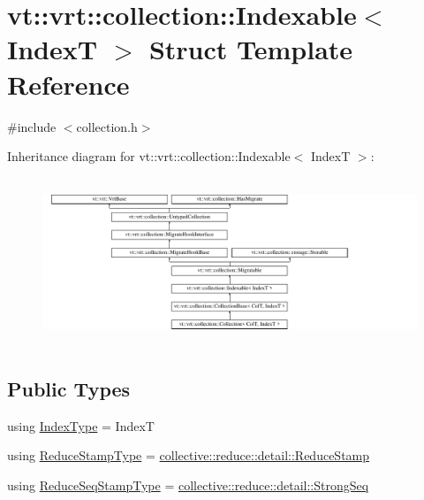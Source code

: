 \hypertarget{structvt_1_1vrt_1_1collection_1_1_indexable}{}\section{vt\+:\+:vrt\+:\+:collection\+:\+:Indexable$<$ IndexT $>$ Struct Template Reference}
\label{structvt_1_1vrt_1_1collection_1_1_indexable}


{\ttfamily \#include $<$collection.\+h$>$}

Inheritance diagram for vt\+:\+:vrt\+:\+:collection\+:\+:Indexable$<$ IndexT $>$\+:\begin{figure}[H]
\begin{center}
\leavevmode
\includegraphics[height=5.028059cm]{structvt_1_1vrt_1_1collection_1_1_indexable}
\end{center}
\end{figure}
\subsection*{Public Types}
\begin{DoxyCompactItemize}
\item 
using \hyperlink{structvt_1_1vrt_1_1collection_1_1_indexable_a448ea88cb04f689e0ff22241f21485c0}{Index\+Type} = IndexT
\item 
using \hyperlink{structvt_1_1vrt_1_1collection_1_1_indexable_a0369a8abcf13550caec736365f7fb30f}{Reduce\+Stamp\+Type} = \hyperlink{namespacevt_1_1collective_1_1reduce_1_1detail_aacc1fcd729d934ba143fee3a943bf9e7}{collective\+::reduce\+::detail\+::\+Reduce\+Stamp}
\item 
using \hyperlink{structvt_1_1vrt_1_1collection_1_1_indexable_af259d608ccabcbe13680763fe5f1c656}{Reduce\+Seq\+Stamp\+Type} = \hyperlink{namespacevt_1_1collective_1_1reduce_1_1detail_affec2854d7d65bafb17eb259714e9443}{collective\+::reduce\+::detail\+::\+Strong\+Seq}
\end{DoxyCompactItemize}
